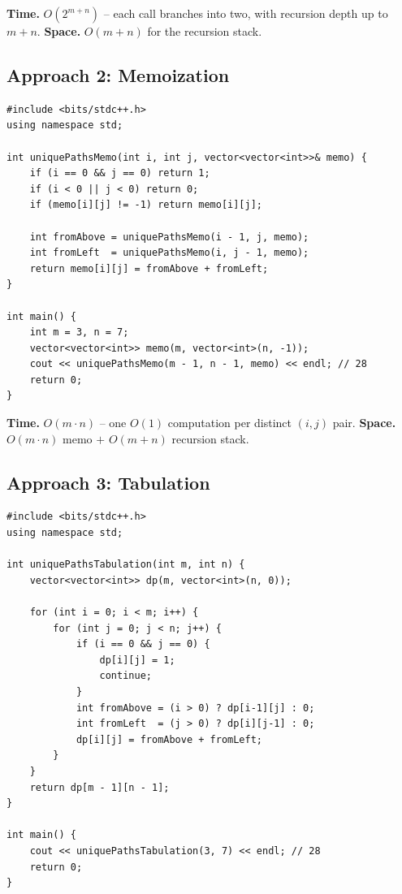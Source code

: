\begin{complexitybox}
\textbf{Time.} $O(2^{m+n})$ -- each call branches into two, with
recursion depth up to $m+n$.
\textbf{Space.} $O(m+n)$ for the recursion stack.
\end{complexitybox}

\subsection*{Approach 2: Memoization}

\begin{lstlisting}
#include <bits/stdc++.h>
using namespace std;

int uniquePathsMemo(int i, int j, vector<vector<int>>& memo) {
    if (i == 0 && j == 0) return 1;
    if (i < 0 || j < 0) return 0;
    if (memo[i][j] != -1) return memo[i][j];

    int fromAbove = uniquePathsMemo(i - 1, j, memo);
    int fromLeft  = uniquePathsMemo(i, j - 1, memo);
    return memo[i][j] = fromAbove + fromLeft;
}

int main() {
    int m = 3, n = 7;
    vector<vector<int>> memo(m, vector<int>(n, -1));
    cout << uniquePathsMemo(m - 1, n - 1, memo) << endl; // 28
    return 0;
}
\end{lstlisting}

\begin{complexitybox}
\textbf{Time.} $O(m \cdot n)$ -- one $O(1)$ computation per distinct
$(i,j)$ pair.
\textbf{Space.} $O(m \cdot n)$ memo $+$ $O(m+n)$ recursion stack.
\end{complexitybox}

\subsection*{Approach 3: Tabulation}

\begin{lstlisting}
#include <bits/stdc++.h>
using namespace std;

int uniquePathsTabulation(int m, int n) {
    vector<vector<int>> dp(m, vector<int>(n, 0));

    for (int i = 0; i < m; i++) {
        for (int j = 0; j < n; j++) {
            if (i == 0 && j == 0) {
                dp[i][j] = 1;
                continue;
            }
            int fromAbove = (i > 0) ? dp[i-1][j] : 0;
            int fromLeft  = (j > 0) ? dp[i][j-1] : 0;
            dp[i][j] = fromAbove + fromLeft;
        }
    }
    return dp[m - 1][n - 1];
}

int main() {
    cout << uniquePathsTabulation(3, 7) << endl; // 28
    return 0;
}
\end{lstlisting}

